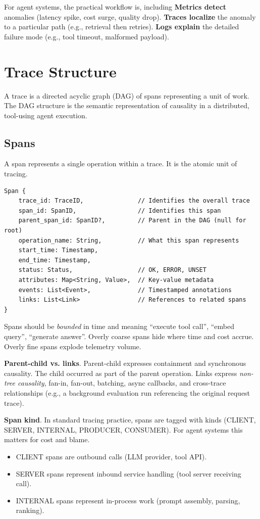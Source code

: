 For agent systems, the practical workflow is, including \textbf{Metrics detect} anomalies (latency spike, cost surge, quality drop).  
\textbf{Traces localize} the anomaly to a particular path (e.g., retrieval then retries).  
\textbf{Logs explain} the detailed failure mode (e.g., tool timeout, malformed payload).

\section{Trace Structure}

A trace is a directed acyclic graph (DAG) of spans representing a unit of work. The DAG structure is the semantic representation of causality in a distributed, tool-using agent execution.

\subsection{Spans}

A span represents a single operation within a trace. It is the atomic unit of tracing.

{\footnotesize{\footnotesize
\begin{verbatim}
Span {
    trace_id: TraceID,               // Identifies the overall trace
    span_id: SpanID,                 // Identifies this span
    parent_span_id: SpanID?,         // Parent in the DAG (null for root)
    operation_name: String,          // What this span represents
    start_time: Timestamp,
    end_time: Timestamp,
    status: Status,                  // OK, ERROR, UNSET
    attributes: Map<String, Value>,  // Key-value metadata
    events: List<Event>,             // Timestamped annotations
    links: List<Link>                // References to related spans
}
\end{verbatim}
}}

Spans should be \emph{bounded} in time and meaning ``execute tool call'', ``embed query'', ``generate answer''. Overly coarse spans hide where time and cost accrue. Overly fine spans explode telemetry volume.

\textbf{Parent-child vs. links}. Parent-child expresses containment and synchronous causality. The child occurred as part of the parent operation. Links express \emph{non-tree causality}, fan-in, fan-out, batching, async callbacks, and cross-trace relationships (e.g., a background evaluation run referencing the original request trace).

\textbf{Span kind}. In standard tracing practice, spans are tagged with kinds (CLIENT, SERVER, INTERNAL, PRODUCER, CONSUMER). For agent systems this matters for cost and blame.
\begin{itemize}
\item CLIENT spans are outbound calls (LLM provider, tool API).
\item SERVER spans represent inbound service handling (tool server receiving call).
\item INTERNAL spans represent in-process work (prompt assembly, parsing, ranking).
\end{itemize}

